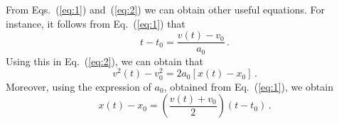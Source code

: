 \documentclass[12pt,a4paper]{article}
\newcommand{\dpar}[1]{\left(#1\right)}
\theoremstyle{definition}
\begin{document}
From Eqs.~(\ref{eq:1}) and~(\ref{eq:2}) we can obtain other useful
equations. For instance, it follows from Eq.~(\ref{eq:1}) that
$$t-t_0=\frac{v(t)-v_0}{a_0}\,.$$
Using this in Eq.~(\ref{eq:2}), we can obtain that
$$v^2(t)-v_0^2=2a_0[x(t)-x_0]\,.$$
Moreover, using the expression of $a_0$, obtained from
Eq.~(\ref{eq:1}), we obtain
$$x(t)-x_0=\dpar{\frac{v(t)+v_0}{2}}(t-t_0)\,.$$
\end{document}
